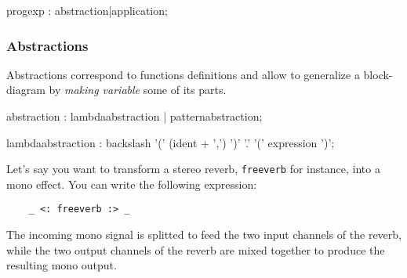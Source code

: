 
\begin{rail}
progexp : abstraction|application;
\end{rail}   
 
\subsubsection{Abstractions}

Abstractions correspond to functions definitions and allow to generalize a block-diagram by \textit{making variable} some of its parts. 

% 

\begin{rail}
abstraction : lambdaabstraction | patternabstraction; 
 
lambdaabstraction :  backslash '(' (ident + ',') ')' '.' '(' expression ')';
\end{rail}

Let's say you want to transform a stereo reverb, \lstinline'freeverb' for instance, into a mono effect. You can write the following expression: 
\begin{lstlisting}
	_ <: freeverb :> _ 
\end{lstlisting}
The incoming mono signal is splitted to feed the two input channels of the reverb, while the two output channels of the reverb are mixed together to produce the resulting mono output.

